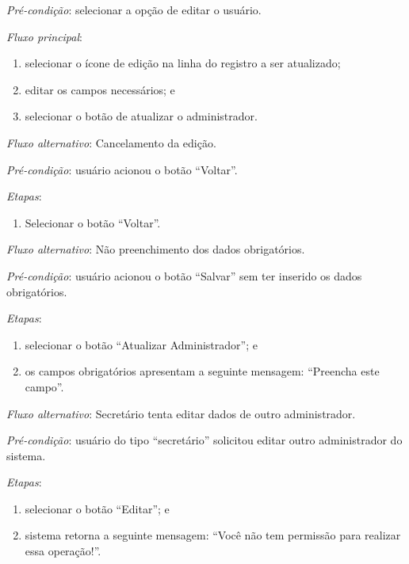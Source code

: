 \vspace{0.7cm}

\noindent \textit{Pré-condição}: selecionar a opção de editar o usuário.

\noindent \textit{Fluxo principal}:

\begin{enumerate}
    \item selecionar o ícone de edição na linha do registro a ser atualizado;
    \item editar os campos necessários; e
    \item selecionar o botão de atualizar o administrador.
\end{enumerate}

\noindent \textit{Fluxo alternativo}: Cancelamento da edição.

\noindent \textit{Pré-condição}: usuário acionou o botão ``Voltar''.

\noindent \textit{Etapas}:

\begin{enumerate}
    \item Selecionar o botão ``Voltar''.
\end{enumerate}

\noindent \textit{Fluxo alternativo}: Não preenchimento dos dados obrigatórios.

\noindent \textit{Pré-condição}: usuário acionou o botão ``Salvar'' sem ter inserido os dados obrigatórios.

\noindent \textit{Etapas}:

\begin{enumerate}
    \item selecionar o botão ``Atualizar Administrador''; e
    \item os campos obrigatórios apresentam a seguinte mensagem: ``Preencha este campo''.
\end{enumerate}



\noindent \textit{Fluxo alternativo}: Secretário tenta editar dados de outro administrador.

\noindent \textit{Pré-condição}: usuário do tipo ``secretário'' solicitou editar outro administrador do sistema.

\noindent \textit{Etapas}:

\begin{enumerate}
    \item selecionar o botão ``Editar''; e
    \item sistema retorna a seguinte mensagem: ``Você não tem permissão para realizar essa operação!''.
\end{enumerate}


